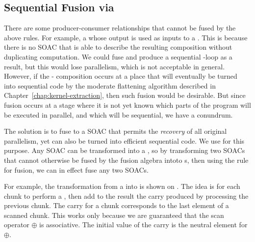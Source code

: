 \begin{description}
\end{description}

\subsection{Sequential Fusion via \StreamSeq{}}
\label{sec:streamseq-fusion}

There are some producer-consumer relationships that cannot be fused by
the above rules.  For example, a  whose output is used as
inputs to a .  This is because there is no SOAC that is able
to describe the resulting composition without duplicating computation.
We could fuse and produce a sequential -loop as a result, but
this would lose parallelism, which is not acceptable in general.
However, if the - composition occurs at a place
that will eventually be turned into sequential code by the moderate
flattening algorithm described in
Chapter~\ref{chap:kernel-extraction}, then such fusion would be
desirable.  But since fusion occurs at a stage where it is not yet
known which parts of the program will be executed in parallel, and
which will be sequential, we have a conundrum.

The solution is to fuse to a SOAC that permits the \textit{recovery}
of all original parallelism, yet can also be turned into efficient
sequential code.  We use \StreamSeq{} for this purpose.  Any SOAC can
be transformed into a \StreamSeq{}, so by transforming two SOACs that
cannot otherwise be fused by the fusion algebra intoto \StreamSeq{}s,
then using the rule for \StreamSeq{} fusion, we can in effect fuse any
two SOACs.

For example, the transformation from a  into \StreamSeq{}
is shown on .  The idea is for each
chunk to perform a , then add to the result the carry
produced by processing the previous chunk.  The carry for a chunk
corresponds to the last element of a scanned chunk.  This works only
because we are guaranteed that the scan operator $\oplus$ is
associative.  The initial value of the carry is the neutral element
for $\oplus$.

